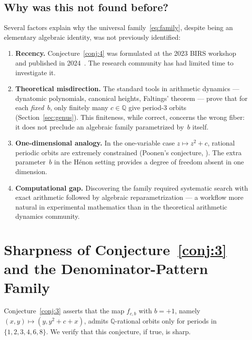 \documentclass[11pt]{article}
\theoremstyle{definition}
\theoremstyle{remark}
\begin{document}
\subsection{Why was this not found before?}\label{sec:whynew}

Several factors explain why the universal family~\eqref{eq:family}, despite being
an elementary algebraic identity, was not previously identified:
\begin{enumerate}
  \item \textbf{Recency.}  Conjecture~\ref{conj:4} was formulated at the 2023
  BIRS workshop and published in 2024~\cite{berger2024}.  The research community
  has had limited time to investigate it.

  \item \textbf{Theoretical misdirection.}  The standard tools in arithmetic
  dynamics --- dynatomic polynomials, canonical heights, Faltings' theorem ---
  prove that for each \emph{fixed}~$b$, only finitely many $c \in \mathbb{Q}$
  give period-$3$ orbits (Section~\ref{sec:genus}).  This finiteness, while
  correct, concerns the wrong fiber: it does not preclude an algebraic family
  parametrized by~$b$ itself.

  \item \textbf{One-dimensional analogy.}  In the one-variable case
  $z \mapsto z^2 + c$, rational periodic orbits are extremely constrained
  (Poonen's conjecture, \cite{flynnpoonenschaefer1997}).
  The extra parameter~$b$ in the H\'enon setting provides a degree of freedom
  absent in one dimension.

  \item \textbf{Computational gap.}  Discovering the family required
  systematic search with exact arithmetic followed by algebraic
  reparametrization --- a workflow more natural in experimental mathematics
  than in the theoretical arithmetic dynamics community.
\end{enumerate}


\section{Sharpness of Conjecture~\ref{conj:3} and the Denominator-Pattern Family}
\label{sec:conj3}

Conjecture~\ref{conj:3} asserts that the map $f_{c,b}$ with $b = +1$,
namely $(x,y) \mapsto (y, y^2+c+x)$,
admits $\mathbb{Q}$-rational orbits only for periods in $\{1,2,3,4,6,8\}$.
We verify that this conjecture, if true, is sharp.
\end{document}
